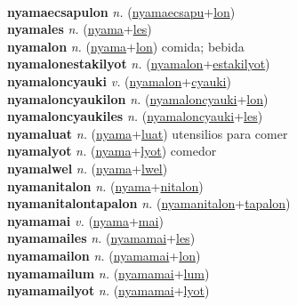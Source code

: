  \label{nyamaecsapules} \\
\textbf{nyamaecsapulon} \textit{n.} (\hyperref[nyamaecsapu]{nyamaecsapu}+\hyperref[lon]{lon})
 \label{nyamaecsapulon} \\
\textbf{nyamales} \textit{n.} (\hyperref[nyama]{nyama}+\hyperref[les]{les})
 \label{nyamales} \\
\textbf{nyamalon} \textit{n.} (\hyperref[nyama]{nyama}+\hyperref[lon]{lon})
comida; bebida \label{nyamalon} \\
\textbf{nyamalonestakilyot} \textit{n.} (\hyperref[nyamalon]{nyamalon}+\hyperref[estakilyot]{estakilyot})
 \label{nyamalonestakilyot} \\
\textbf{nyamaloncyauki} \textit{v.} (\hyperref[nyamalon]{nyamalon}+\hyperref[cyauki]{cyauki})
 \label{nyamaloncyauki} \\
\textbf{nyamaloncyaukilon} \textit{n.} (\hyperref[nyamaloncyauki]{nyamaloncyauki}+\hyperref[lon]{lon})
 \label{nyamaloncyaukilon} \\
\textbf{nyamaloncyaukiles} \textit{n.} (\hyperref[nyamaloncyauki]{nyamaloncyauki}+\hyperref[les]{les})
 \label{nyamaloncyaukiles} \\
\textbf{nyamaluat} \textit{n.} (\hyperref[nyama]{nyama}+\hyperref[luat]{luat})
utensilios para comer \label{nyamaluat} \\
\textbf{nyamalyot} \textit{n.} (\hyperref[nyama]{nyama}+\hyperref[lyot]{lyot})
comedor \label{nyamalyot} \\
\textbf{nyamalwel} \textit{n.} (\hyperref[nyama]{nyama}+\hyperref[lwel]{lwel})
 \label{nyamalwel} \\
\textbf{nyamanitalon} \textit{n.} (\hyperref[nyama]{nyama}+\hyperref[nitalon]{nitalon})
 \label{nyamanitalon} \\
\textbf{nyamanitalontapalon} \textit{n.} (\hyperref[nyamanitalon]{nyamanitalon}+\hyperref[tapalon]{tapalon})
 \label{nyamanitalontapalon} \\
\textbf{nyamamai} \textit{v.} (\hyperref[nyama]{nyama}+\hyperref[mai]{mai})
 \label{nyamamai} \\
\textbf{nyamamailes} \textit{n.} (\hyperref[nyamamai]{nyamamai}+\hyperref[les]{les})
 \label{nyamamailes} \\
\textbf{nyamamailon} \textit{n.} (\hyperref[nyamamai]{nyamamai}+\hyperref[lon]{lon})
 \label{nyamamailon} \\
\textbf{nyamamailum} \textit{n.} (\hyperref[nyamamai]{nyamamai}+\hyperref[lum]{lum})
 \label{nyamamailum} \\
\textbf{nyamamailyot} \textit{n.} (\hyperref[nyamamai]{nyamamai}+\hyperref[lyot]{lyot})
